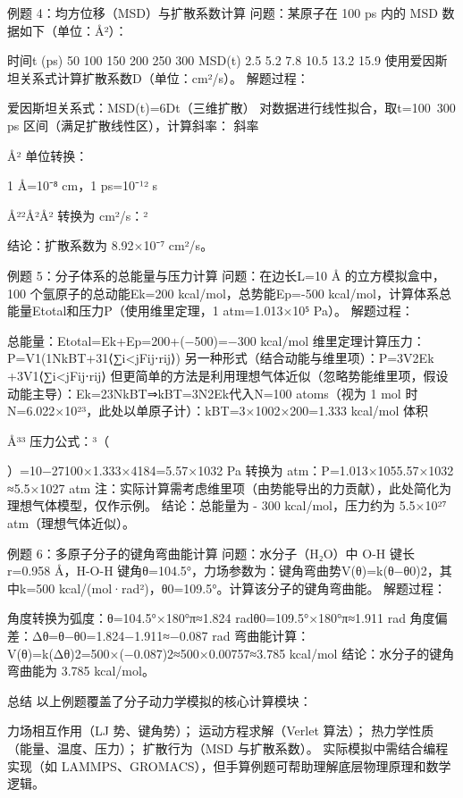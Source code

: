 例题 4：均方位移（MSD）与扩散系数计算
问题：某原子在 100 ps 内的 MSD 数据如下（单位：Å²）：

时间t (ps)	50	100	150	200	250	300
MSD(t)	2.5	5.2	7.8	10.5	13.2	15.9
使用爱因斯坦关系式计算扩散系数D（单位：cm²/s）。						
解题过程：						

    爱因斯坦关系式：MSD(t)=6Dt（三维扩散）
    对数据进行线性拟合，取t=100~300 ps 区间（满足扩散线性区），计算斜率：
        斜率

Å²
单位转换：

    1 Å=10⁻⁸ cm，1 ps=10⁻¹² s

Å²²Å²Å²
转换为 cm²/s：²


        结论：扩散系数为 8.92×10⁻⁷ cm²/s。

例题 5：分子体系的总能量与压力计算
问题：在边长L=10 Å 的立方模拟盒中，100 个氩原子的总动能Ek​=200 kcal/mol，总势能Ep​=-500 kcal/mol，计算体系总能量Etotal​和压力P（使用维里定理，1 atm=1.013×10⁵ Pa）。
解题过程：

    总能量：Etotal​=Ek​+Ep​=200+(−500)=−300 kcal/mol
    维里定理计算压力：P=V1​(1NkB​T​+31​⟨∑i<j​Fij​⋅rij​⟩)
    另一种形式（结合动能与维里项）：P=3V2Ek​​+3V1​⟨∑i<j​Fij​⋅rij​⟩
    但更简单的方法是利用理想气体近似（忽略势能维里项，假设动能主导）：Ek​=23​NkB​T⇒kB​T=3N2Ek​​
    代入N=100 atoms（视为 1 mol 时N=6.022×10²³，此处以单原子计）：kB​T=3×1002×200​=1.333 kcal/mol
    体积

Å³³
压力公式：³（

    ）=10−27100×1.333×4184​=5.57×1032 Pa
    转换为 atm：P=1.013×1055.57×1032​≈5.5×1027 atm
    注：实际计算需考虑维里项（由势能导出的力贡献），此处简化为理想气体模型，仅作示例。
    结论：总能量为 - 300 kcal/mol，压力约为 5.5×10²⁷ atm（理想气体近似）。

例题 6：多原子分子的键角弯曲能计算
问题：水分子（H₂O）中 O-H 键长r=0.958 Å，H-O-H 键角θ=104.5°，力场参数为：键角弯曲势V(θ)=k(θ−θ0​)2，其中k=500 kcal/(mol·rad²)，θ0​=109.5°。计算该分子的键角弯曲能。
解题过程：

    角度转换为弧度：θ=104.5°×180°π​≈1.824 radθ0​=109.5°×180°π​≈1.911 rad
    角度偏差：Δθ=θ−θ0​=1.824−1.911≈−0.087 rad
    弯曲能计算：V(θ)=k(Δθ)2=500×(−0.087)2≈500×0.00757≈3.785 kcal/mol
    结论：水分子的键角弯曲能为 3.785 kcal/mol。

总结
以上例题覆盖了分子动力学模拟的核心计算模块：

    力场相互作用（LJ 势、键角势）；
    运动方程求解（Verlet 算法）；
    热力学性质（能量、温度、压力）；
    扩散行为（MSD 与扩散系数）。
    实际模拟中需结合编程实现（如 LAMMPS、GROMACS），但手算例题可帮助理解底层物理原理和数学逻辑。

